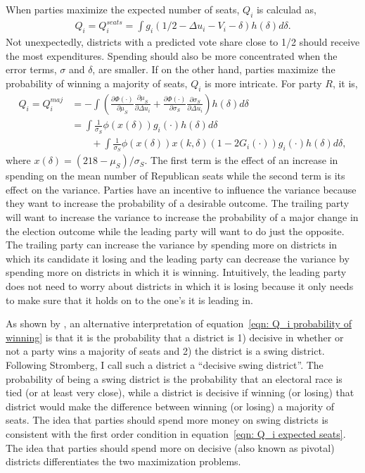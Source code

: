 \documentclass[12pt,final,fleqn]{article}
\theoremstyle{plain}
\begin{document}
When parties maximize the expected number of seats, $Q_i$ is calculad as, 
\begin{align} \label{eqn: Q_i expected seats}
Q_i = Q_i^{seats} = \int  g_i(1/2 - \Delta u_i - V_i - \delta) h(\delta) d\delta.
\end{align}
Not unexpectedly, districts with a predicted vote share close to 1/2 should receive the most expenditures. Spending should also be more concentrated when the error terms, $\sigma$ and $\delta$, are smaller. If on the other hand, parties maximize the probability of winning a majority of seats, $Q_i$ is more intricate. For party $R$, it is,
\begin{align} \label{eqn: Q_i probability of winning}
Q_i  = Q_i^{maj} &= - \int \left(\frac{\partial \Phi(\cdot)}{\partial \mu_S}\frac{\partial \mu_S}{\partial \Delta u_i}+\frac{\partial \Phi(\cdot)}{\partial \sigma_S}\frac{\partial \sigma_S}{\partial \Delta u_i}\right)h(\delta)d\delta  \\
& = \int \frac{1}{\sigma_S}\phi(x(\delta))g_i(\cdot)h(\delta)d\delta \nonumber \\
 &\qquad + \int \frac{1}{\sigma_S}\phi(x(\delta))x(k, \delta)\left(1-2G_i(\cdot)\right) g_i(\cdot)h(\delta)d\delta,
\end{align}
where $x(\delta) = \left(218 - \mu_S\right)/\sigma_S$. The first term is the effect of an increase in spending on the mean number of Republican seats while the second term is its effect on the variance. Parties have an incentive to influence the variance because they want to increase the probability of a desirable outcome. The trailing party will want to increase the variance to increase the probability of a major change in the election outcome while the leading party will want to do just the opposite. The trailing party can increase the variance by spending more on districts in which its candidate it losing and the leading party can decrease the variance by spending more on districts in which it is winning. Intuitively, the leading party does not need to worry about districts in which it is losing because it only needs to make sure that it holds on to the one's it is leading in.

As shown by \citet{stromberg2008electoral}, an alternative interpretation of equation~\ref{eqn: Q_i probability of winning} is that it is the probability that a district is 1) decisive in whether or not a party wins a majority of seats and 2) the district is a swing district. Following Stromberg, I call such a district a ``decisive swing district''. The probability of being a swing district is the probability that an electoral race is tied (or at least very close), while a district is decisive if winning (or losing) that district would make the difference between winning (or losing) a majority of seats. The idea that parties should spend more money on swing districts is consistent with the first order condition in equation~\ref{eqn: Q_i expected seats}. The idea that parties should spend more on decisive (also known as pivotal) districts differentiates the two maximization problems.
\end{document}
